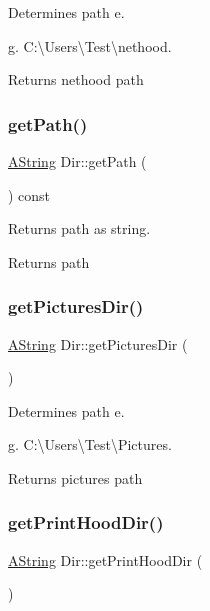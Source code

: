 Determines path e. 

g. C\+:\textbackslash{}\+Users\textbackslash{}\+Test\textbackslash{}nethood. \begin{DoxyReturn}{Returns}
nethood path 
\end{DoxyReturn}
\mbox{\label{class_dir_a000627e9787773619bccc3d4ef76a7ac}} 
\subsubsection{\texorpdfstring{getPath()}{getPath()}}
{\footnotesize\ttfamily \mbox{\hyperlink{class_a_string}{A\+String}} Dir\+::get\+Path (\begin{DoxyParamCaption}{ }\end{DoxyParamCaption}) const}



Returns path as string. 

\begin{DoxyReturn}{Returns}
path 
\end{DoxyReturn}
\mbox{\label{class_dir_a63c22c3f3fa2afeb2d7b789493975145}} 
\subsubsection{\texorpdfstring{getPicturesDir()}{getPicturesDir()}}
{\footnotesize\ttfamily \mbox{\hyperlink{class_a_string}{A\+String}} Dir\+::get\+Pictures\+Dir (\begin{DoxyParamCaption}{ }\end{DoxyParamCaption})\hspace{0.3cm}{\ttfamily [static]}}



Determines path e. 

g. C\+:\textbackslash{}\+Users\textbackslash{}\+Test\textbackslash{}\+Pictures. \begin{DoxyReturn}{Returns}
pictures path 
\end{DoxyReturn}
\mbox{\label{class_dir_a8ee1276c2733ed6de73ea0b75e2c2eae}} 
\subsubsection{\texorpdfstring{getPrintHoodDir()}{getPrintHoodDir()}}
{\footnotesize\ttfamily \mbox{\hyperlink{class_a_string}{A\+String}} Dir\+::get\+Print\+Hood\+Dir (\begin{DoxyParamCaption}{ }\end{DoxyParamCaption})\hspace{0.3cm}{\ttfamily [static]}}



